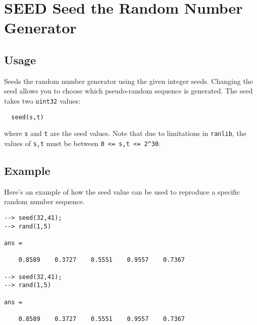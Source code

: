 \section{SEED Seed the Random Number Generator}

\subsection{Usage}

Seeds the random number generator using the given integer seeds.  
Changing the seed allows you to choose which pseudo-random
sequence is generated.  The seed takes two \verb|uint32| values:
\begin{verbatim}
  seed(s,t)
\end{verbatim}
where \verb|s| and \verb|t| are the seed values.  Note that due to limitations
in \verb|ranlib|, the values of \verb|s,t| must be between \verb|0 <= s,t <= 2^30|.
\subsection{Example}

Here's an example of how the seed value can be used to reproduce
a specific random number sequence.
\begin{verbatim}
--> seed(32,41);
--> rand(1,5)

ans = 

    0.8589    0.3727    0.5551    0.9557    0.7367 

--> seed(32,41);
--> rand(1,5)

ans = 

    0.8589    0.3727    0.5551    0.9557    0.7367 
\end{verbatim}

